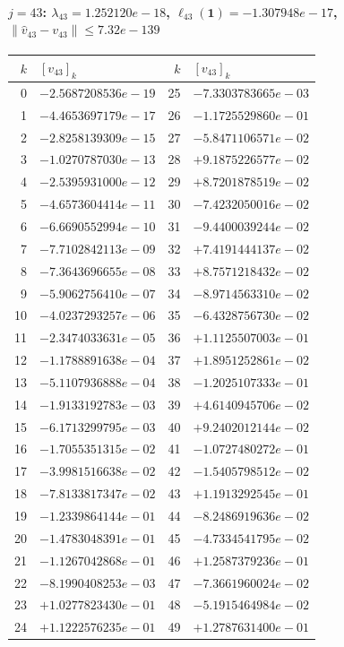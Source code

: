\documentclass[11pt]{article}
\begin{document}
\paragraph{$j = 43$: $\lambda_{43} = 1.252120e-18$, \quad $\ell_{43}(\mathbf{1}) = -1.307948e-17$, \quad $\|\hat v_{43} - v_{43}\| \leq 7.32e-139$}
\begin{center}
{\footnotesize
\begin{tabular}{r@{\;\;}l@{\quad}r@{\;\;}l}
\toprule
$k$ & $[v_{43}]_k$ & $k$ & $[v_{43}]_k$ \\
\midrule
0 & $-2.5687208536e-19$ & 25 & $-7.3303783665e-03$ \\
1 & $-4.4653697179e-17$ & 26 & $-1.1725529860e-01$ \\
2 & $-2.8258139309e-15$ & 27 & $-5.8471106571e-02$ \\
3 & $-1.0270787030e-13$ & 28 & $+9.1875226577e-02$ \\
4 & $-2.5395931000e-12$ & 29 & $+8.7201878519e-02$ \\
5 & $-4.6573604414e-11$ & 30 & $-7.4232050016e-02$ \\
6 & $-6.6690552994e-10$ & 31 & $-9.4400039244e-02$ \\
7 & $-7.7102842113e-09$ & 32 & $+7.4191444137e-02$ \\
8 & $-7.3643696655e-08$ & 33 & $+8.7571218432e-02$ \\
9 & $-5.9062756410e-07$ & 34 & $-8.9714563310e-02$ \\
10 & $-4.0237293257e-06$ & 35 & $-6.4328756730e-02$ \\
11 & $-2.3474033631e-05$ & 36 & $+1.1125507003e-01$ \\
12 & $-1.1788891638e-04$ & 37 & $+1.8951252861e-02$ \\
13 & $-5.1107936888e-04$ & 38 & $-1.2025107333e-01$ \\
14 & $-1.9133192783e-03$ & 39 & $+4.6140945706e-02$ \\
15 & $-6.1713299795e-03$ & 40 & $+9.2402012144e-02$ \\
16 & $-1.7055351315e-02$ & 41 & $-1.0727480272e-01$ \\
17 & $-3.9981516638e-02$ & 42 & $-1.5405798512e-02$ \\
18 & $-7.8133817347e-02$ & 43 & $+1.1913292545e-01$ \\
19 & $-1.2339864144e-01$ & 44 & $-8.2486919636e-02$ \\
20 & $-1.4783048391e-01$ & 45 & $-4.7334541795e-02$ \\
21 & $-1.1267042868e-01$ & 46 & $+1.2587379236e-01$ \\
22 & $-8.1990408253e-03$ & 47 & $-7.3661960024e-02$ \\
23 & $+1.0277823430e-01$ & 48 & $-5.1915464984e-02$ \\
24 & $+1.1222576235e-01$ & 49 & $+1.2787631400e-01$ \\
\bottomrule
\end{tabular}
}
\end{center}
\end{document}
